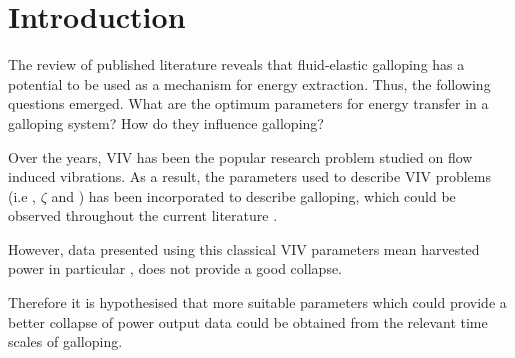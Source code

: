 \chapter{Introduction}

The review of published literature reveals that fluid-elastic galloping has a potential to be used as a mechanism for energy extraction. Thus, the following questions emerged. What are the optimum parameters for energy transfer in a galloping system? How do they influence galloping?

Over the years, VIV has been the popular research problem  studied on flow induced vibrations. As a result, the parameters used to describe VIV problems (i.e \mstar, $\zeta$ and \ustar) has been incorporated to describe galloping, which could be observed throughout the current literature \citep{Barrero-Gil2009,Barrero-Gil2010a,Parkinson1964}.

However, data presented using this classical VIV parameters mean harvested power in particular \citep{Barrero-Gil2010a}, does not provide a good collapse.

Therefore it is hypothesised that more suitable parameters which could provide a better collapse of power output data could be obtained from the relevant time scales of galloping. 

 